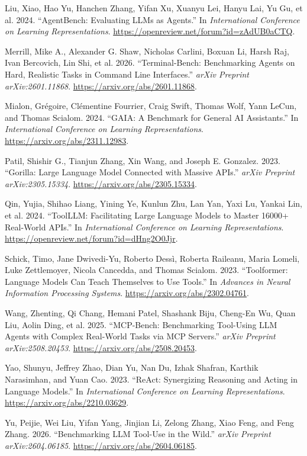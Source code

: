 \documentclass[
  10pt,
]{article}
\newlength{\cslhangindent}
\newenvironment{CSLReferences}[2] %
 {\begin{list}{}{%
  \setlength{\itemindent}{0pt}
  \setlength{\leftmargin}{0pt}
  \setlength{\parsep}{0pt}
  \ifodd #1
   \setlength{\leftmargin}{\cslhangindent}
   \setlength{\itemindent}{-1\cslhangindent}
  \fi
  \setlength{\itemsep}{#2\baselineskip}}}
 {\end{list}}
\begin{document}
\protect{}\label{refs}
\begin{CSLReferences}{1}{0}
Liu, Xiao, Hao Yu, Hanchen Zhang, Yifan Xu, Xuanyu Lei, Hanyu Lai, Yu
Gu, et al. 2024. {``AgentBench: Evaluating LLMs as Agents.''} In
\emph{International Conference on Learning Representations}.
\url{https://openreview.net/forum?id=zAdUB0aCTQ}.

Merrill, Mike A., Alexander G. Shaw, Nicholas Carlini, Boxuan Li, Harsh
Raj, Ivan Bercovich, Lin Shi, et al. 2026. {``Terminal-Bench:
Benchmarking Agents on Hard, Realistic Tasks in Command Line
Interfaces.''} \emph{arXiv Preprint arXiv:2601.11868}.
\url{https://arxiv.org/abs/2601.11868}.

Mialon, Grégoire, Clémentine Fourrier, Craig Swift, Thomas Wolf, Yann
LeCun, and Thomas Scialom. 2024. {``GAIA: A Benchmark for General AI
Assistants.''} In \emph{International Conference on Learning
Representations}. \url{https://arxiv.org/abs/2311.12983}.

Patil, Shishir G., Tianjun Zhang, Xin Wang, and Joseph E. Gonzalez.
2023. {``Gorilla: Large Language Model Connected with Massive APIs.''}
\emph{arXiv Preprint arXiv:2305.15334}.
\url{https://arxiv.org/abs/2305.15334}.

Qin, Yujia, Shihao Liang, Yining Ye, Kunlun Zhu, Lan Yan, Yaxi Lu,
Yankai Lin, et al. 2024. {``ToolLLM: Facilitating Large Language Models
to Master 16000+ Real-World APIs.''} In \emph{International Conference
on Learning Representations}.
\url{https://openreview.net/forum?id=dHng2O0Jjr}.

Schick, Timo, Jane Dwivedi-Yu, Roberto Dessì, Roberta Raileanu, Maria
Lomeli, Luke Zettlemoyer, Nicola Cancedda, and Thomas Scialom. 2023.
{``Toolformer: Language Models Can Teach Themselves to Use Tools.''} In
\emph{Advances in Neural Information Processing Systems}.
\url{https://arxiv.org/abs/2302.04761}.

Wang, Zhenting, Qi Chang, Hemani Patel, Shashank Biju, Cheng-En Wu, Quan
Liu, Aolin Ding, et al. 2025. {``MCP-Bench: Benchmarking Tool-Using LLM
Agents with Complex Real-World Tasks via MCP Servers.''} \emph{arXiv
Preprint arXiv:2508.20453}. \url{https://arxiv.org/abs/2508.20453}.

Yao, Shunyu, Jeffrey Zhao, Dian Yu, Nan Du, Izhak Shafran, Karthik
Narasimhan, and Yuan Cao. 2023. {``ReAct: Synergizing Reasoning and
Acting in Language Models.''} In \emph{International Conference on
Learning Representations}. \url{https://arxiv.org/abs/2210.03629}.

Yu, Peijie, Wei Liu, Yifan Yang, Jinjian Li, Zelong Zhang, Xiao Feng,
and Feng Zhang. 2026. {``Benchmarking LLM Tool-Use in the Wild.''}
\emph{arXiv Preprint arXiv:2604.06185}.
\url{https://arxiv.org/abs/2604.06185}.

\end{CSLReferences}
\end{document}
